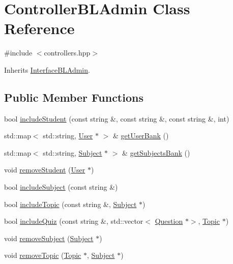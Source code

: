 \hypertarget{class_controller_b_l_admin}{}\section{Controller\+B\+L\+Admin Class Reference}
\label{class_controller_b_l_admin}


{\ttfamily \#include $<$controllers.\+hpp$>$}



Inherits \hyperlink{class_interface_b_l_admin}{Interface\+B\+L\+Admin}.

\subsection*{Public Member Functions}
\begin{DoxyCompactItemize}
\item 
bool \hyperlink{class_controller_b_l_admin_a6e077c2cf0d0420c4104a637e930b764}{include\+Student} (const string \&, const string \&, const string \&, int)
\item 
std\+::map$<$ std\+::string, \hyperlink{class_user}{User} $\ast$ $>$ \& \hyperlink{class_controller_b_l_admin_add75e8118f5e4f37775edfcb104281aa}{get\+User\+Bank} ()
\item 
std\+::map$<$ std\+::string, \hyperlink{class_subject}{Subject} $\ast$ $>$ \& \hyperlink{class_controller_b_l_admin_a86f1e998ca81cc440594d62e60fc1ed9}{get\+Subjects\+Bank} ()
\item 
void \hyperlink{class_controller_b_l_admin_ad504705ce46509672751a4adfe1fa773}{remove\+Student} (\hyperlink{class_user}{User} $\ast$)
\item 
bool \hyperlink{class_controller_b_l_admin_a6c78d14f6b7fa350a63c5dbb2ac31084}{include\+Subject} (const string \&)
\item 
bool \hyperlink{class_controller_b_l_admin_abec5332aa0ecec899ea7ea814c2b2f5e}{include\+Topic} (const string \&, \hyperlink{class_subject}{Subject} $\ast$)
\item 
bool \hyperlink{class_controller_b_l_admin_a995da6bb9402ddb388794ff6410aebe5}{include\+Quiz} (const string \&, std\+::vector$<$ \hyperlink{class_question}{Question} $\ast$$>$, \hyperlink{class_topic}{Topic} $\ast$)
\item 
void \hyperlink{class_controller_b_l_admin_ab6be786a6347283943640ccba01ac2d1}{remove\+Subject} (\hyperlink{class_subject}{Subject} $\ast$)
\item 
void \hyperlink{class_controller_b_l_admin_a615837120d6e4ba94fa32f13d2e8fac1}{remove\+Topic} (\hyperlink{class_topic}{Topic} $\ast$, \hyperlink{class_subject}{Subject} $\ast$)
$$
\end{DoxyCompactItemize}
